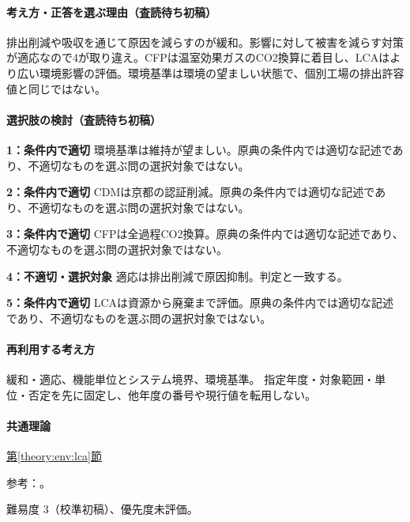 \paragraph{考え方・正答を選ぶ理由（査読待ち初稿）} 排出削減や吸収を通じて原因を減らすのが緩和。影響に対して被害を減らす対策が適応なので4が取り違え。CFPは温室効果ガスのCO2換算に着目し、LCAはより広い環境影響の評価。環境基準は環境の望ましい状態で、個別工場の排出許容値と同じではない。

\paragraph{選択肢の検討（査読待ち初稿）}\mbox{}\par

\noindent\textbf{1：条件内で適切} 環境基準は維持が望ましい。原典の条件内では適切な記述であり、不適切なものを選ぶ問の選択対象ではない。\par

\noindent\textbf{2：条件内で適切} CDMは京都の認証削減。原典の条件内では適切な記述であり、不適切なものを選ぶ問の選択対象ではない。\par

\noindent\textbf{3：条件内で適切} CFPは全過程CO2換算。原典の条件内では適切な記述であり、不適切なものを選ぶ問の選択対象ではない。\par

\noindent\textbf{4：不適切・選択対象} 適応は排出削減で原因抑制。判定と一致する。\par

\noindent\textbf{5：条件内で適切} LCAは資源から廃棄まで評価。原典の条件内では適切な記述であり、不適切なものを選ぶ問の選択対象ではない。\par

\paragraph{再利用する考え方} 緩和・適応、機能単位とシステム境界、環境基準。 指定年度・対象範囲・単位・否定を先に固定し、他年度の番号や現行値を転用しない。

\paragraph{共通理論} \hyperref[theory:env:lca]{第\ref*{theory:env:lca}節}

\par 参考：\cite{env58_pmstandard}。

\par 難易度 3（校準初稿）、優先度未評価。

